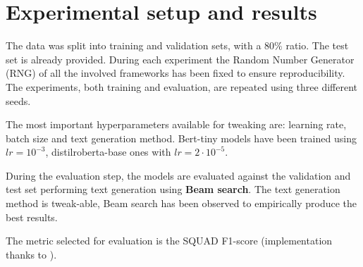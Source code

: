 \documentclass[11pt]{article}
\begin{document}



\section{Experimental setup and results}
\label{sec:results}

The data was split into training and validation sets, with a $80\%$ ratio. The test set is already provided.
During each experiment the Random Number Generator (RNG) of all the involved frameworks has been fixed to ensure reproducibility. The experiments, both training and evaluation, are repeated using three different seeds. 

The most important hyperparameters available for tweaking are: learning rate, batch size and text generation method. Bert-tiny models have been trained using $lr=10^{-3}$, distilroberta-base ones with $lr=2\cdot10^{-5}$.

During the evaluation step, the models are evaluated against the validation and test set performing text generation using \textbf{Beam search}. The text generation method is tweak-able, Beam search has been observed to empirically produce the best results.

The metric selected for evaluation is the SQUAD F1-score\cite{Rajpurkar2018} (implementation thanks to \cite{Gardner2017}). 
\end{document}
